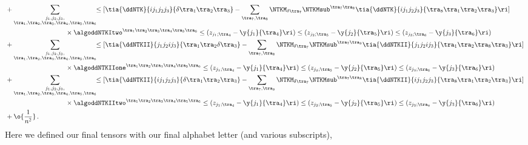 \begin{align}
&+\sum_{\substack{ j_1,j_2,j_3, \\ \tra_1,\tra_2,\tra_3,\tra_4,\tra_5,\tra_6} }\!\! \le[ \tia{\ddNTK}{i j_1j_2j_3}{\delta\tra_1\tra_2\tra_3}-\sum_{\tra_7,\tra_8}\NTKM_{\delta\tra_7}\NTKMsub^{\tra_7\tra_8}\tia{\ddNTK}{i j_1j_2j_3}{\tra_8\tra_1\tra_2\tra_3}\ri] 
\notag \, \\
&\quad\quad\quad\quad\quad\quad\quad\quad\quad\times \algoddNTKItwo^{\tra_1\tra_2\tra_3\tra_4\tra_5\tra_6}\le(z_{j_1;\tra_4}-\y{j_1}{\tra_4}\ri)\le(z_{j_2;\tra_5}-\y{j_2}{\tra_5}\ri)\le(z_{j_3;\tra_6}-\y{j_3}{\tra_6}\ri)\, \notag \\
&+\sum_{\substack{ j_1,j_2,j_3, \\ \tra_1,\tra_2,\tra_3,\tra_4,\tra_5,\tra_6} }\!\! \le[ \tia{\ddNTKII}{j_1 j_2ij_3}{\tra_1\tra_2\delta\tra_3}-\sum_{\tra_7,\tra_8}\NTKM_{\delta\tra_7}\NTKMsub^{\tra_7\tra_8}\tia{\ddNTKII}{j_1j_2ij_3}{\tra_1\tra_2\tra_8\tra_3}\ri] 
\notag \, \\
&\quad\quad\quad\quad\quad\quad\quad\quad\quad\times \algoddNTKIIone^{\tra_1\tra_2\tra_3\tra_4\tra_5\tra_6}\le(z_{j_1;\tra_4}-\y{j_1}{\tra_4}\ri)\le(z_{j_2;\tra_5}-\y{j_2}{\tra_5}\ri)\le(z_{j_3;\tra_6}-\y{j_3}{\tra_6}\ri)\, \notag \\
&+\sum_{\substack{ j_1,j_2,j_3, \\ \tra_1,\tra_2,\tra_3,\tra_4,\tra_5,\tra_6} }\!\! \le[ \tia{\ddNTKII}{i j_1j_2j_3}{\delta\tra_1\tra_2\tra_3}-\sum_{\tra_7,\tra_8}\NTKM_{\delta\tra_7}\NTKMsub^{\tra_7\tra_8}\tia{\ddNTKII}{i j_1j_2j_3}{\tra_8\tra_1\tra_2\tra_3}\ri] 
\notag \, \\
&\quad\quad\quad\quad\quad\quad\quad\quad\quad\times \algoddNTKIItwo^{\tra_1\tra_2\tra_3\tra_4\tra_5\tra_6}\le(z_{j_1;\tra_4}-\y{j_1}{\tra_4}\ri)\le(z_{j_2;\tra_5}-\y{j_2}{\tra_5}\ri)\le(z_{j_3;\tra_6}-\y{j_3}{\tra_6}\ri)\, \notag \\
&+\o{\frac{1}{n^2}} \, \notag .
\end{align}
Here we defined our final tensors with our final alphabet letter (and various
subscripts),
